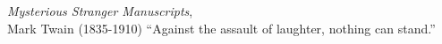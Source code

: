 \vspace*{\fill}
{\raggedleft
\thispagestyle{empty} %
\begin{chapquote}{ 
    \textit{Mysterious Stranger Manuscripts},\\ 
    Mark Twain (1835-1910)
}
  ``Against the assault of laughter, nothing can stand.''
\end{chapquote}}

\vspace*{\fill}